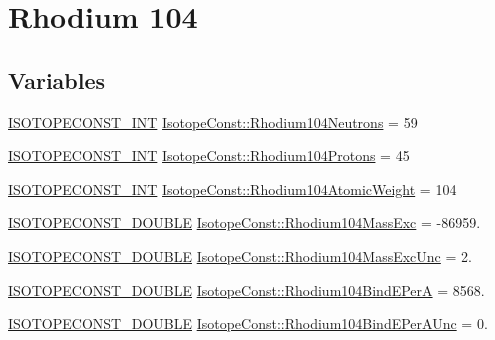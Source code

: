 \hypertarget{group___isotope_const-_rhodium-_rh104}{}\section{Rhodium 104}
\label{group___isotope_const-_rhodium-_rh104}
\subsection*{Variables}
\begin{DoxyCompactItemize}
\item 
\mbox{\hyperlink{group___isotope_const-_macros_ga5f18360b3e99483a35c32d789e62621c}{I\+S\+O\+T\+O\+P\+E\+C\+O\+N\+S\+T\+\_\+\+I\+NT}} \mbox{\hyperlink{group___isotope_const-_rhodium-_rh104_gadcc506521177f7b848ed827c8582195e}{Isotope\+Const\+::\+Rhodium104\+Neutrons}} = 59
\item 
\mbox{\hyperlink{group___isotope_const-_macros_ga5f18360b3e99483a35c32d789e62621c}{I\+S\+O\+T\+O\+P\+E\+C\+O\+N\+S\+T\+\_\+\+I\+NT}} \mbox{\hyperlink{group___isotope_const-_rhodium-_rh104_ga0627079e6a2071db783dba5bab1c3def}{Isotope\+Const\+::\+Rhodium104\+Protons}} = 45
\item 
\mbox{\hyperlink{group___isotope_const-_macros_ga5f18360b3e99483a35c32d789e62621c}{I\+S\+O\+T\+O\+P\+E\+C\+O\+N\+S\+T\+\_\+\+I\+NT}} \mbox{\hyperlink{group___isotope_const-_rhodium-_rh104_ga14d33e759633bcd1e7463336b07d875e}{Isotope\+Const\+::\+Rhodium104\+Atomic\+Weight}} = 104
\item 
\mbox{\hyperlink{group___isotope_const-_macros_ga8f45a7272ce02c0b4c65c44636ed719a}{I\+S\+O\+T\+O\+P\+E\+C\+O\+N\+S\+T\+\_\+\+D\+O\+U\+B\+LE}} \mbox{\hyperlink{group___isotope_const-_rhodium-_rh104_ga48286e31493f0746e79fa5bacafde710}{Isotope\+Const\+::\+Rhodium104\+Mass\+Exc}} = -\/86959.
\item 
\mbox{\hyperlink{group___isotope_const-_macros_ga8f45a7272ce02c0b4c65c44636ed719a}{I\+S\+O\+T\+O\+P\+E\+C\+O\+N\+S\+T\+\_\+\+D\+O\+U\+B\+LE}} \mbox{\hyperlink{group___isotope_const-_rhodium-_rh104_ga061cd0aae2f8de4f7e87082013ad1b65}{Isotope\+Const\+::\+Rhodium104\+Mass\+Exc\+Unc}} = 2.
\item 
\mbox{\hyperlink{group___isotope_const-_macros_ga8f45a7272ce02c0b4c65c44636ed719a}{I\+S\+O\+T\+O\+P\+E\+C\+O\+N\+S\+T\+\_\+\+D\+O\+U\+B\+LE}} \mbox{\hyperlink{group___isotope_const-_rhodium-_rh104_ga364f0ce1702a53ef77670e3eae6eb5ef}{Isotope\+Const\+::\+Rhodium104\+Bind\+E\+PerA}} = 8568.
\item 
\mbox{\hyperlink{group___isotope_const-_macros_ga8f45a7272ce02c0b4c65c44636ed719a}{I\+S\+O\+T\+O\+P\+E\+C\+O\+N\+S\+T\+\_\+\+D\+O\+U\+B\+LE}} \mbox{\hyperlink{group___isotope_const-_rhodium-_rh104_gadad097b6a537fd3e0ef7b90778282a7c}{Isotope\+Const\+::\+Rhodium104\+Bind\+E\+Per\+A\+Unc}} = 0.

\end{DoxyCompactItemize}

